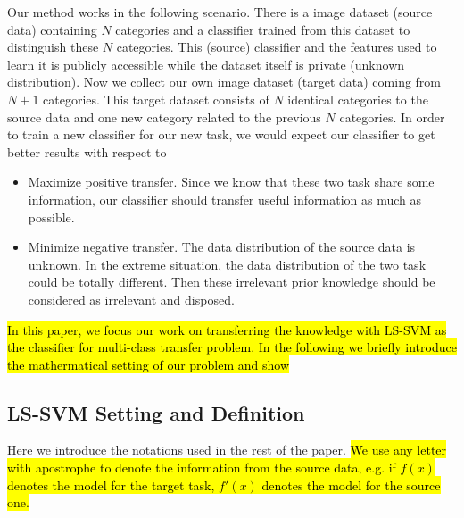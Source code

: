 Our method works in the following scenario. There is a image dataset (source data) containing $N$ categories and a classifier trained from this dataset to distinguish these $N$ categories. This (source) classifier and the features used to learn it is publicly accessible while the dataset itself is private (unknown distribution).  Now we collect our own image dataset (target data) coming from $N+1$ categories. This target dataset consists of $N$ identical categories to the source data and one new category related to the previous $N$ categories. In order to train a new classifier for our new task, we would expect our classifier to get better results with respect to 
\begin{itemize}
\item Maximize positive transfer. Since we know that these two task share some information, our classifier should transfer useful information as much as possible.
\item Minimize negative transfer. The data distribution of the source data is unknown. In the extreme situation, the data distribution of the two task could be totally different. Then these irrelevant prior knowledge should be considered as irrelevant and disposed.
\end{itemize}

\hl{In this paper, we focus our work on transferring the knowledge with LS-SVM as the classifier for multi-class transfer problem. In the following we briefly introduce the mathermatical setting of our problem and show   }

\subsection{LS-SVM Setting and Definition}
Here we introduce the notations used in the rest of the paper. \hl{We use any letter with apostrophe to denote the information from the source data, e.g. if $f(x)$ denotes the model for the target task, $f'(x)$ denotes the model for the source one.}

